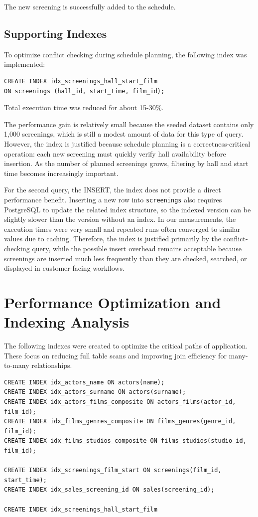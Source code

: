 \documentclass[11pt, a4paper]{article}
\begin{document}
The new screening is successfully added to the schedule.

\subsection{Supporting Indexes}
To optimize conflict checking during schedule planning, the following index was implemented:
\begin{lstlisting}
CREATE INDEX idx_screenings_hall_start_film
ON screenings (hall_id, start_time, film_id);
\end{lstlisting}

Total execution time was reduced for about 15-30\%.

The performance gain is relatively small because the seeded dataset contains only 1,000 screenings,
which is still a modest amount of data for this type of query.
However, the index is justified because schedule planning is a correctness-critical operation:
each new screening must quickly verify hall availability before insertion.
As the number of planned screenings grows, filtering by hall and start time becomes increasingly important.

For the second query, the INSERT, the index does not provide a direct performance benefit.
Inserting a new row into \texttt{screenings} also requires PostgreSQL to update the related index structure,
so the indexed version can be slightly slower than the version without an index.
In our measurements, the execution times were very small and repeated runs often converged to similar values due to caching.
Therefore, the index is justified primarily by the conflict-checking query, while the possible insert overhead remains acceptable because screenings are inserted much less frequently than they are checked, searched, or displayed in customer-facing workflows.


\section{Performance Optimization and Indexing Analysis}
The following indexes were created to optimize the critical paths of application.
These focus on reducing full table scans and improving join efficiency for many-to-many relationships.
\begin{lstlisting}
CREATE INDEX idx_actors_name ON actors(name);
CREATE INDEX idx_actors_surname ON actors(surname);
CREATE INDEX idx_actors_films_composite ON actors_films(actor_id, film_id);
CREATE INDEX idx_films_genres_composite ON films_genres(genre_id, film_id);
CREATE INDEX idx_films_studios_composite ON films_studios(studio_id, film_id);

CREATE INDEX idx_screenings_film_start ON screenings(film_id, start_time);
CREATE INDEX idx_sales_screening_id ON sales(screening_id);

CREATE INDEX idx_screenings_hall_start_film
\end{lstlisting}
\end{document}
